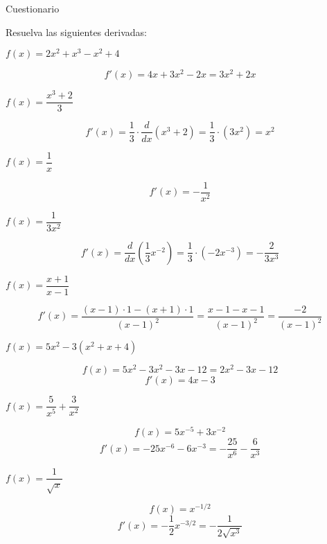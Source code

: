 \documentclass[answers]{exam} %
\begin{document}
\vspace{0.5cm}
\large Cuestionario
\vspace{0.5cm}

Resuelva las siguientes derivadas:
\begin{questions}
    \question $f(x)=2x^2+x^3-x^2+4$
    \begin{solution}
    \[
    f'(x) = 4x + 3x^2 - 2x = 3x^2 + 2x
    \]
    \end{solution}
    
    \question $f(x)=\dfrac{x^3+2}{3}$
    \begin{solution}
    \[
    f'(x) = \frac{1}{3} \cdot \frac{d}{dx}(x^3 + 2) = \frac{1}{3} \cdot (3x^2) = x^2
    \]
    \end{solution}
    
    \question $f(x)=\dfrac{1}{x}$
    \begin{solution}
    \[
    f'(x) = -\frac{1}{x^2}
    \]
    \end{solution}
    
    \question $f(x)=\dfrac{1}{3x^2}$
    \begin{solution}
    \[
    f'(x) = \frac{d}{dx}\left(\frac{1}{3}x^{-2}\right) = \frac{1}{3} \cdot (-2x^{-3}) = -\frac{2}{3x^3}
    \]
    \end{solution}
    
    \question $f(x)=\dfrac{x+1}{x-1}$
    \begin{solution}
    \[
    f'(x) = \frac{(x-1)\cdot 1 - (x+1)\cdot 1}{(x-1)^2} = \frac{x-1-x-1}{(x-1)^2} = \frac{-2}{(x-1)^2}
    \]
    \end{solution}
    
    \question $f(x)=5x^2-3(x^2+x+4)$
    \begin{solution}
    \[
    f(x) = 5x^2 - 3x^2 - 3x - 12 = 2x^2 - 3x - 12
    \]
    \[
    f'(x) = 4x - 3
    \]
    \end{solution}
    
    \question $f(x)=\dfrac{5}{x^5}+\dfrac{3}{x^2}$
    \begin{solution}
    \[
    f(x) = 5x^{-5} + 3x^{-2}
    \]
    \[
    f'(x) = -25x^{-6} - 6x^{-3} = -\frac{25}{x^6} - \frac{6}{x^3}
    \]
    \end{solution}
    
    \question $f(x)=\dfrac{1}{\sqrt{x}}$
    \begin{solution}
    \[
    f(x) = x^{-1/2}
    \]
    \[
    f'(x) = -\frac{1}{2}x^{-3/2} = -\frac{1}{2\sqrt{x^3}}
    \]
    \end{solution}
    

\end{questions}
\end{document}
